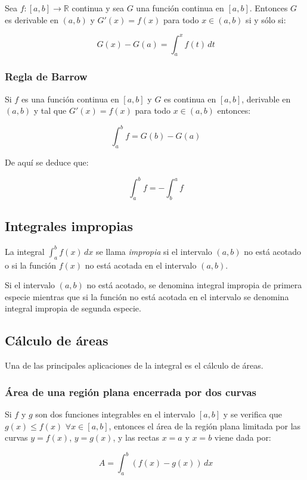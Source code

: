 Sea $f : [a,b]\rightarrow\mathbb{R}$ continua y sea $G$ una función
continua en $[a,b]$. Entonces $G$ es derivable en $(a,b)$ y
$G'(x)=f(x)$ para todo $x\in(a,b)$ si y sólo si:

\[
\ G(x)-G(a) = \int_{a}^{x}f(t)\,dt
\]

\subsubsection*{Regla de Barrow}

Si $f$ es una función continua en $[a,b]$ y $G$ es continua en
$[a,b]$, derivable en $(a,b)$ y tal que $G'(x)=f(x)$ para todo
$x\in(a,b)$ entonces:

\[
\  \int_{a}^{b}{f} = G(b)-G(a)
\]


De aquí se deduce que:

\[
\  \int_{a}^{b}{f} = -\int_{b}^{a}{f}
\]


\subsection{Integrales impropias}

La integral $ \int_{a}^{b}{f(x)\,dx}$ se llama \emph{impropia} si el
intervalo $(a,b)$ no está acotado o si la función $f(x)$ no está
acotada en el intervalo $(a,b)$.

Si el intervalo $(a,b)$ no está acotado, se denomina integral
impropia de primera especie mientras que si la función no está
acotada en el intervalo se denomina integral impropia de segunda
especie.

\subsection{Cálculo de áreas}
Una de las principales aplicaciones de la integral es el cálculo de
áreas.

\subsubsection*{Área de una región plana encerrada por dos curvas}

Si $f$ y $g$ son dos funciones integrables en el intervalo $[a,b]$ y
se verifica que $g(x)\leq f(x)$ $\forall x\in[a,b]$, entonces el
área de la región plana limitada por las curvas $y=f(x)$, $y=g(x)$,
y las rectas $x=a$ y $x=b$ viene dada por:

\[
\ A = \int_{a}^{b}{(f(x)- g(x))\,dx}
\]\\

